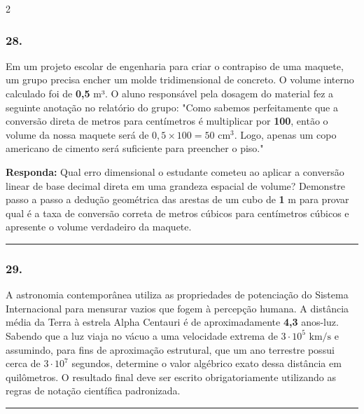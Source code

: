 \documentclass[twoside, 10pt, a4paper]{article}
\newlength{\espacoPreQuestao}\setlength{\espacoPreQuestao}{0.1cm}
\newlength{\espacoQuestao}\setlength{\espacoQuestao}{0.2cm}
\begin{document}
\begin{multicols*}{2}
\subsubsection*{28.} Em um projeto escolar de engenharia para criar o contrapiso de uma maquete, um grupo precisa encher um molde tridimensional de concreto. O volume interno calculado foi de \textbf{0,5} m³. O aluno responsável pela dosagem do material fez a seguinte anotação no relatório do grupo: "Como sabemos perfeitamente que a conversão direta de metros para centímetros é multiplicar por \textbf{100}, então o volume da nossa maquete será de $0,5 \times 100 = 50 \text{ cm}^3$. Logo, apenas um copo americano de cimento será suficiente para preencher o piso."
\begin{boxresponda}
\textbf{Responda:} Qual erro dimensional o estudante cometeu ao aplicar a conversão linear de base decimal direta em uma grandeza espacial de volume? Demonstre passo a passo a dedução geométrica das arestas de um cubo de \textbf{1} m para provar qual é a taxa de conversão correta de metros cúbicos para centímetros cúbicos e apresente o volume verdadeiro da maquete.
\end{boxresponda}
\par\vspace{\espacoQuestao}

\noindent\textcolor{CorLinha}{\rule{\linewidth}{0.5pt}} 
\par\vspace{\espacoPreQuestao}
\subsubsection*{29.} A astronomia contemporânea utiliza as propriedades de potenciação do Sistema Internacional para mensurar vazios que fogem à percepção humana. A distância média da Terra à estrela Alpha Centauri é de aproximadamente \textbf{4,3} anos-luz. Sabendo que a luz viaja no vácuo a uma velocidade extrema de $3 \cdot 10^5 \text{ km/s}$ e assumindo, para fins de aproximação estrutural, que um ano terrestre possui cerca de $3 \cdot 10^7$ segundos, determine o valor algébrico exato dessa distância em quilômetros. O resultado final deve ser escrito obrigatoriamente utilizando as regras de notação científica padronizada.
\par\vspace{\espacoQuestao}

\noindent\textcolor{CorLinha}{\rule{\linewidth}{0.5pt}} 
\par\vspace{\espacoPreQuestao}

\end{multicols*}
\end{document}
